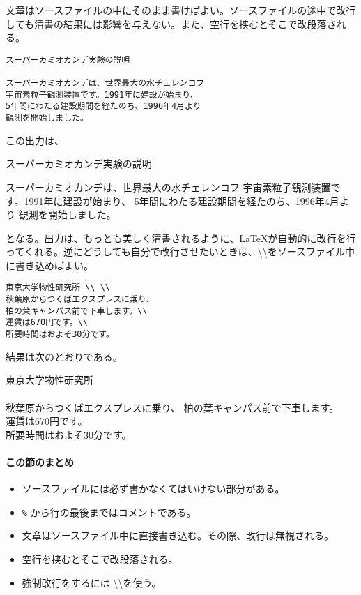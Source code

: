 文章はソースファイルの中にそのまま書けばよい。ソースファイルの途中で改行しても清書の結果には影響を与えない。また、空行を挟むとそこで改段落される。
\begin{reidai}
\begin{verbatim}
スーパーカミオカンデ実験の説明

スーパーカミオカンデは、世界最大の水チェレンコフ
宇宙素粒子観測装置です。1991年に建設が始まり、
5年間にわたる建設期間を経たのち、1996年4月より
観測を開始しました。
\end{verbatim}
\end{reidai} \noindent
この出力は、
\begin{kekka}
スーパーカミオカンデ実験の説明

スーパーカミオカンデは、世界最大の水チェレンコフ
宇宙素粒子観測装置です。1991年に建設が始まり、
5年間にわたる建設期間を経たのち、1996年4月より
観測を開始しました。
\end{kekka} \noindent
となる。出力は、もっとも美しく清書されるように、\LaTeX が自動的に改行を行ってくれる。逆にどうしても自分で改行させたいときは、\textbackslash \textbackslash をソースファイル中に書き込めばよい。
\begin{reidai}
\begin{verbatim}
東京大学物性研究所 \\ \\
秋葉原からつくばエクスプレスに乗り、
柏の葉キャンパス前で下車します。\\
運賃は670円です。\\
所要時間はおよそ30分です。
\end{verbatim}
\end{reidai} \noindent
結果は次のとおりである。
\begin{kekka}
東京大学物性研究所 \\ \\
秋葉原からつくばエクスプレスに乗り、
柏の葉キャンパス前で下車します。\\
運賃は670円です。\\
所要時間はおよそ30分です。
\end{kekka}

\paragraph{この節のまとめ}

\begin{itemize}
\item ソースファイルには必ず書かなくてはいけない部分がある。
\item \texttt{\%} から行の最後まではコメントである。
\item 文章はソースファイル中に直接書き込む。その際、改行は無視される。
\item 空行を挟むとそこで改段落される。
\item 強制改行をするには \textbackslash \textbackslash を使う。
\end{itemize}



